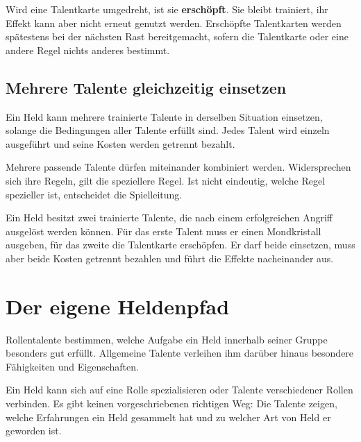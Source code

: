 Wird eine Talentkarte umgedreht, ist sie \textbf{erschöpft}. Sie bleibt trainiert, ihr Effekt kann aber nicht erneut genutzt werden. Erschöpfte Talentkarten werden spätestens bei der nächsten Rast bereitgemacht, sofern die Talentkarte oder eine andere Regel nichts anderes bestimmt.

\subsection{Mehrere Talente gleichzeitig einsetzen}

Ein Held kann mehrere trainierte Talente in derselben Situation einsetzen, solange die Bedingungen aller Talente erfüllt sind. Jedes Talent wird einzeln ausgeführt und seine Kosten werden getrennt bezahlt.

\begin{kurzregel}[title=Mehrere Talente kombinieren]
Mehrere passende Talente dürfen miteinander kombiniert werden. Widersprechen sich ihre Regeln, gilt die speziellere Regel. Ist nicht eindeutig, welche Regel spezieller ist, entscheidet die Spielleitung.
\end{kurzregel}

\begin{beispiel}[title=Beispiel: Zwei Talente gleichzeitig]
Ein Held besitzt zwei trainierte Talente, die nach einem erfolgreichen Angriff ausgelöst werden können. Für das erste Talent muss er einen Mondkristall ausgeben, für das zweite die Talentkarte erschöpfen. Er darf beide einsetzen, muss aber beide Kosten getrennt bezahlen und führt die Effekte nacheinander aus.
\end{beispiel}

\section{Der eigene Heldenpfad}

Rollentalente bestimmen, welche Aufgabe ein Held innerhalb seiner Gruppe besonders gut erfüllt. Allgemeine Talente verleihen ihm darüber hinaus besondere Fähigkeiten und Eigenschaften.

Ein Held kann sich auf eine Rolle spezialisieren oder Talente verschiedener Rollen verbinden. Es gibt keinen vorgeschriebenen richtigen Weg: Die Talente zeigen, welche Erfahrungen ein Held gesammelt hat und zu welcher Art von Held er geworden ist.
